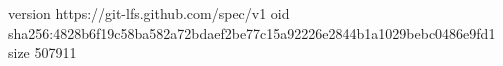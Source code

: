 version https://git-lfs.github.com/spec/v1
oid sha256:4828b6f19c58ba582a72bdaef2be77c15a92226e2844b1a1029bebc0486e9fd1
size 507911

